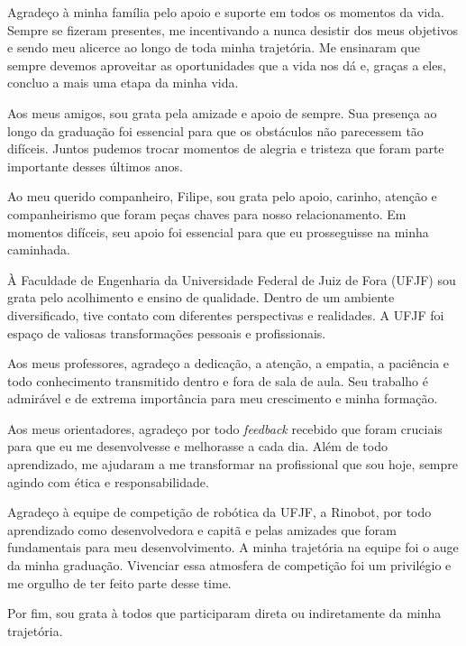 \documentclass[
12pt,
openany, %
oneside, %
a4paper,			
english,			
brazil			        %
]{abntbibufjf}
\begin{document}
	
	\begin{agradecimentos}
		
		
	Agradeço à minha família pelo apoio e suporte em todos os momentos da vida. Sempre se fizeram presentes, me incentivando a nunca desistir dos meus objetivos e sendo meu alicerce ao longo de toda minha trajetória. Me ensinaram que sempre devemos aproveitar as oportunidades que a vida nos dá e, graças a eles, concluo a mais uma etapa da minha vida.
	
	Aos meus amigos, sou grata pela amizade e apoio de sempre. Sua presença ao longo da graduação foi essencial para que os obstáculos não parecessem tão difíceis. Juntos pudemos trocar momentos de alegria e tristeza que foram parte importante desses últimos anos.
	
	Ao meu querido companheiro, Filipe, sou grata pelo apoio, carinho, atenção e companheirismo que foram peças chaves para nosso relacionamento. Em momentos difíceis, seu apoio foi essencial para que eu prosseguisse na minha caminhada.
	
	À Faculdade de Engenharia da Universidade Federal de Juiz de Fora (UFJF) sou grata pelo acolhimento e ensino de qualidade. Dentro de um ambiente diversificado, tive contato com diferentes perspectivas e realidades. A UFJF foi espaço de valiosas transformações pessoais e profissionais.
	
	Aos meus professores, agradeço a dedicação, a atenção, a empatia, a paciência e todo conhecimento transmitido dentro e fora de sala de aula. Seu trabalho é admirável e de extrema importância para meu crescimento e minha formação.
	
	Aos meus orientadores, agradeço por todo \textit{feedback} recebido que foram cruciais para que eu me desenvolvesse e melhorasse a cada dia. Além de todo aprendizado, me ajudaram a me transformar na profissional que sou hoje, sempre agindo com ética e responsabilidade.
	
	Agradeço à equipe de competição de robótica da UFJF, a Rinobot, por todo aprendizado como desenvolvedora e capitã e pelas amizades que foram fundamentais para meu desenvolvimento. A minha trajetória na equipe foi o auge da minha graduação. Vivenciar essa atmosfera de competição foi um privilégio e me orgulho de ter feito parte desse time.
	
	Por fim, sou grata à todos que participaram direta ou indiretamente da minha trajetória.
	
	

		
	\end{agradecimentos}
	
\end{document}
